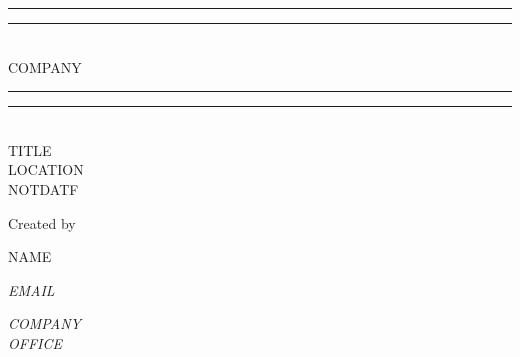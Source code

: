 \documentclass[12pt]{report}
\newlength{\drop}
\begin{document}
  \begin{titlepage}
    \centering
    \textheight
    \vspace*{\baselineskip}
    \rule{\textwidth}{1.6pt}\vspace*{-\baselineskip}\vspace*{2pt}
    \rule{\textwidth}{0.4pt}\\[\baselineskip]
    {\LARGE COMPANY}\\[0.2\baselineskip]
    \rule{\textwidth}{0.4pt}\vspace*{-\baselineskip}\vspace{3.2pt}
    \rule{\textwidth}{1.6pt}\\[\baselineskip]
    \scshape
    TITLE \\
    LOCATION \\
    NOTDATF\par
    \vspace*{2\baselineskip}
    Created by \\[\baselineskip]
    {\Large NAME\par}
    {\itshape EMAIL\par}
    {\itshape COMPANY \\ OFFICE\par}
  \end{titlepage}
\end{document}
